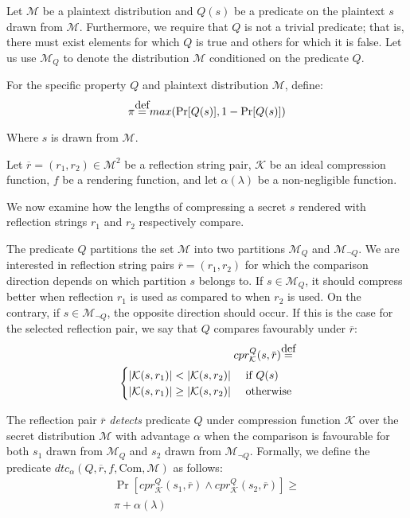 Let $\mathcal{M}$ be a plaintext distribution and $Q(s)$ be a predicate on the
plaintext $s$ drawn from $\mathcal{M}$. Furthermore, we require that $Q$ is not a
trivial predicate; that is, there must exist elements for which $Q$ is true and
others for which it is false.  Let us use $\mathcal{M}_Q$ to denote the
distribution $\mathcal{M}$ conditioned on the predicate $Q$.

For the specific property $Q$ and plaintext distribution $\mathcal{M}$, define:
\begin{equation*}
    \pi \defeq max(\Pr[Q(s)], 1 - \Pr[Q(s)])
\end{equation*}

Where $s$ is drawn from $\mathcal{M}$.

Let $\overbar{r} = (r_1, r_2) \in \mathcal{M}^2$ be a reflection string pair,
$\mathcal{K}$ be an ideal compression function, $f$ be a rendering function, and
let $\alpha(\lambda)$ be a non-negligible function.

We now examine how the lengths of compressing a secret $s$ rendered with
reflection strings $r_1$ and $r_2$ respectively compare.

The predicate $Q$ partitions the set $\mathcal{M}$ into two partitions
$\mathcal{M}_Q$ and $\mathcal{M}_{\lnot Q}$. We are interested in reflection
string pairs $\overbar{r} = (r_1, r_2)$ for which the comparison direction
depends on which partition $s$ belongs to.  If $s \in \mathcal{M}_Q$, it should
compress better when reflection $r_1$ is used as compared to when $r_2$ is used.
On the contrary, if $s \in \mathcal{M}_{\lnot Q}$, the opposite direction should
occur.  If this is the case for the selected reflection pair, we say that $Q$
compares favourably under $\overbar{r}$:
\begin{equation*}
\begin{split}
    cpr^Q_{\mathcal{K}}(s, \overbar{r})
    \defeq\\
    \begin{cases}
        |\mathcal{K}(s, r_1)| < |\mathcal{K}(s, r_2)| &\text{ if } Q(s)\\
        |\mathcal{K}(s, r_1)| \geq |\mathcal{K}(s, r_2)| &\text{ otherwise}
    \end{cases}
\end{split}
\end{equation*}

The reflection pair $\overbar{r}$ \textit{detects} predicate $Q$ under
compression function $\mathcal{K}$ over the secret distribution $\mathcal{M}$ with
advantage $\alpha$ when the comparison is favourable for both $s_1$ drawn from
$\mathcal{M}_Q$ and $s_2$ drawn from $\mathcal{M}_{\lnot Q}$. Formally, we
define the predicate $dtc_\alpha(Q, \overbar{r}, f, \textrm{Com}, \mathcal{M})$
as follows:
\begin{align*}
    \Pr
        [cpr^Q_{\mathcal{K}}(s_1, \overbar{r}) \land
         cpr^Q_{\mathcal{K}}(s_2, \overbar{r})]
    \geq\\
    \pi + \alpha(\lambda)
\end{align*}

